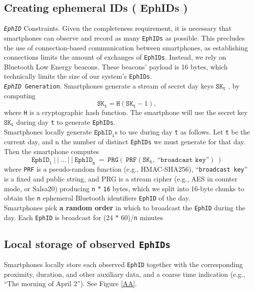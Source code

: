 \documentclass[12pt,a4paper]{article}
\begin{document}
\subsection*{Creating ephemeral IDs ( EphIDs )}
\texttt{\textit{EphID}} Constraints. Given the completeness requirement, it is necessary that smartphones can observe and record as many \texttt{EphIDs} as possible. This precludes the use of connection-based communication between smartphones, as establishing connections limits the amount of exchanges of \texttt{EphIDs}. Instead, we rely on Bluetooth Low Energy beacons. These beacons’ payload is 16 bytes, which technically limits the size of our system’s \texttt{EphIDs}.\\[0.3cm]
\texttt{\textit{EphID} Generation}. Smartphones generate a stream of secret day keys $\texttt{SK}_\texttt{t}$ , by computing
\[\texttt{SK}_\texttt{t}  = \texttt{H}(\texttt{SK}_\texttt{t} - 1) ,\]
where \texttt{H} is a cryptographic hash function. The smartphone will use the secret key $\texttt{SK}_\texttt{t}$ during day \texttt{t}  to generate \texttt{EphIDs}.\\[0.3cm]
Smartphones locally generate $\texttt{EphID}_\texttt{i}$s to use during day \texttt{t} as follows. Let \texttt{t} be the current day, and n the number of distinct \texttt{EphIDs} we must generate for that day. Then the smartphone computes
\[\texttt{EphID}_1\  \vert\ \vert\ \ldots\ \vert\ \vert\ \texttt{EphID}_\texttt{n}\ =\ \texttt{PRG} (\ \texttt{PRF}(\texttt{SK}_\texttt{t} ,\ “\texttt{broadcast key}”)\ )\]
where \texttt{PRF} is a pseudo-random function (e.g., HMAC-SHA256), “\texttt{broadcast key}” is a fixed and public string, and PRG is a stream cipher (e.g., AES in counter mode, or Salsa20) producing \texttt{n} $\ast$ \texttt{16} bytes, which we split into 16-byte chunks to obtain the \texttt{n} ephemeral Bluetooth identifiers \texttt{EphID} of the day.\\[0.3cm]
Smartphones pick \textbf{a random order} in which to broadcast the \texttt{EphID} during the day. Each \texttt{EphID} is broadcast for (24 $\ast$ 60)/\texttt{n}  minutes
\subsection*{Local storage of observed \texttt{EphIDs}}
Smartphones locally store each observed \texttt{EphID} together with the corresponding proximity, duration, and other auxiliary data, and a coarse time indication (e.g., “The morning of April 2”). See Figure \ref{AA}.
\end{document}
